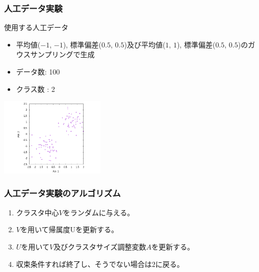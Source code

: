 \documentclass[13pt,dvipdfmx]{beamer}
\begin{document}
\begin{frame}\frametitle{人工データ実験}
  \begin{block}{使用する人工データ}
    \begin{itemize}
    \item 平均値($-1$, $-1$), 標準偏差($0.5$, $0.5$)及び平均値($1$, $1$), 標準偏差($0.5$, $0.5$)のガウスサンプリングで生成
    \item データ数: 100
    \item クラス数 : 2
    \end{itemize}
    \begin{center}
      \includegraphics[width=50mm]{2d-dat.png}
    \end{center}
  \end{block}
    
\end{frame}

\begin{frame}\frametitle{人工データ実験のアルゴリズム}
  \begin{enumerate}
  \item クラスタ中心$V$をランダムに与える。
  \item $V$を用いて帰属度Uを更新する。
  \item $U$を用いて$V$及びクラスタサイズ調整変数$A$を更新する。
  \item 収束条件すれば終了し、そうでない場合は$2$に戻る。
  \end{enumerate}
\end{frame}
\end{document}
